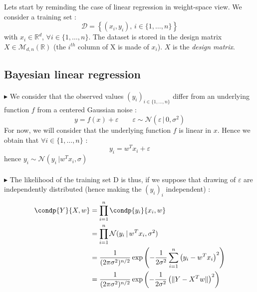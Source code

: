 \documentclass[a4paper]{article}
\begin{document}
	{
		Lets start by reminding the case of \textsf{linear regression} in weight-space view. We consider a training set :
		\begin{equation}
			\mathcal{D} = \left\{ (x_i,y_i),\, i\in\{1,\hdots,n\}\right\}
		\end{equation}
		with $x_i\in\mathbb{R}^d$, $\forall i\in\{1,\hdots, n\}$. The dataset is stored in the design matrix $X\in\mathcal{M}_{d,n}(\mathbb{R})$ (the $i^{th}$ column of X is made of $x_i$). $X$ is the \emph{design matrix}.
		
		\subsection{Bayesian linear regression}
		{
			\paragraph{} $\blacktriangleright$ We consider that the observed values $(y_i)_{i\in\{1,\hdots,n\}}$ differ from an underlying function $f$ from a centered Gaussian noise : 
			\begin{equation}
				y = f(x) + \varepsilon \qquad \varepsilon \sim \mathcal{N}(\varepsilon \, \vert \, 0,\sigma^2)
			\end{equation}
			For now, we will consider that the underlying function $f$ is linear in $x$. Hence we obtain that $\forall i\in\{1, \hdots, n\}$ : 
			\begin{equation}
				y_i = w^Tx_i + \varepsilon
			\end{equation}
			hence $y_i \sim \mathcal{N}(y_i\, \vert w^Tx_i, \sigma)$
			
			\paragraph{} $\blacktriangleright$ The likelihood of the training set D is thus, if we suppose that drawing of $\varepsilon$ are independently distributed (hence making the $(y_i)_i$ independent) : 
			\begin{equation}
				\begin{aligned}
					\condp{Y}{X,w} &= \prod_{i=1}^n \condp{y_i}{x_i,w} \\
								&=\prod_{i=1}^n \mathcal{N}(y_i \, \vert \, w^Tx_i, \sigma^2)\\
								&= \frac{1}{(2\pi\sigma^2)^{n/2}} \exp{ \left( -\frac{1}{2\sigma^2} \sum_{i=1}^n \left(y_i - w^Tx_i\right)^2\right)}\\
								&=  \frac{1}{(2\pi\sigma^2)^{n/2}} \exp{\left(-\frac{1}{2\sigma^2}\left( \lVert Y - X^Tw\lVert \right)^2\right)}
				\end{aligned}
			\end{equation}
			
}}
\end{document}
